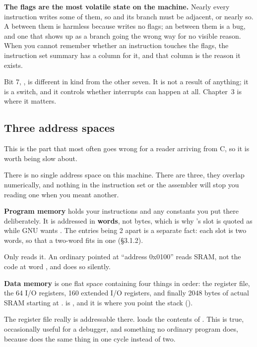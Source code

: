 \textbf{The flags are the most volatile state on the machine.} Nearly every instruction writes
some of them, so  and its branch must be adjacent, or nearly so. A  between
them is harmless because  writes no flags; an  between them is a bug, and one
that shows up as a branch going the wrong way for no visible reason. When you cannot remember
whether an instruction touches the flags, the instruction set summary has a column for it, and
that column is the reason it exists.

Bit 7, , is different in kind from the other seven. It is not a result of anything; it is
a switch, and it controls whether interrupts can happen at all. Chapter~3 is where it matters.

\subsection{Three address spaces}
\label{c1:sec:spaces}
This is the part that most often goes wrong for a reader arriving from C, so it is worth being
slow about.


There is no single address space on this machine. There are three, they overlap numerically, and
nothing in the instruction set or the assembler will stop you reading one when you meant another.

\textbf{Program memory} holds your instructions and any constants you put there deliberately. It
is addressed in \textbf{words}, not bytes, which is why 's slot is quoted as
 while GNU  wants . The entries being 2 apart is a separate fact:
each slot is two words, so that a two-word  fits in one (\S3.1.2).

Only  reads it. An ordinary  pointed at ``address 0x0100'' reads SRAM, not the
code at word , and does so silently.

\textbf{Data memory} is one flat space containing four things in order: the register file, the 64
I/O registers, 160 extended I/O registers, and finally 2048 bytes of actual SRAM starting at
.  is , and it is where you point the stack
().

The register file really is addressable there.  loads the contents of
. This is true, occasionally useful for a debugger, and something no ordinary program
does, because  does the same thing in one cycle instead of two.

